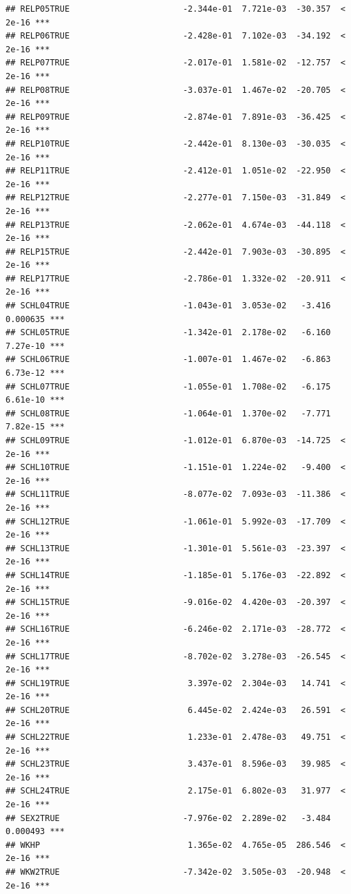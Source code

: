 \documentclass[
]{article}
\begin{document}
\begin{verbatim}
## RELP05TRUE                       -2.344e-01  7.721e-03  -30.357  < 2e-16 ***
## RELP06TRUE                       -2.428e-01  7.102e-03  -34.192  < 2e-16 ***
## RELP07TRUE                       -2.017e-01  1.581e-02  -12.757  < 2e-16 ***
## RELP08TRUE                       -3.037e-01  1.467e-02  -20.705  < 2e-16 ***
## RELP09TRUE                       -2.874e-01  7.891e-03  -36.425  < 2e-16 ***
## RELP10TRUE                       -2.442e-01  8.130e-03  -30.035  < 2e-16 ***
## RELP11TRUE                       -2.412e-01  1.051e-02  -22.950  < 2e-16 ***
## RELP12TRUE                       -2.277e-01  7.150e-03  -31.849  < 2e-16 ***
## RELP13TRUE                       -2.062e-01  4.674e-03  -44.118  < 2e-16 ***
## RELP15TRUE                       -2.442e-01  7.903e-03  -30.895  < 2e-16 ***
## RELP17TRUE                       -2.786e-01  1.332e-02  -20.911  < 2e-16 ***
## SCHL04TRUE                       -1.043e-01  3.053e-02   -3.416 0.000635 ***
## SCHL05TRUE                       -1.342e-01  2.178e-02   -6.160 7.27e-10 ***
## SCHL06TRUE                       -1.007e-01  1.467e-02   -6.863 6.73e-12 ***
## SCHL07TRUE                       -1.055e-01  1.708e-02   -6.175 6.61e-10 ***
## SCHL08TRUE                       -1.064e-01  1.370e-02   -7.771 7.82e-15 ***
## SCHL09TRUE                       -1.012e-01  6.870e-03  -14.725  < 2e-16 ***
## SCHL10TRUE                       -1.151e-01  1.224e-02   -9.400  < 2e-16 ***
## SCHL11TRUE                       -8.077e-02  7.093e-03  -11.386  < 2e-16 ***
## SCHL12TRUE                       -1.061e-01  5.992e-03  -17.709  < 2e-16 ***
## SCHL13TRUE                       -1.301e-01  5.561e-03  -23.397  < 2e-16 ***
## SCHL14TRUE                       -1.185e-01  5.176e-03  -22.892  < 2e-16 ***
## SCHL15TRUE                       -9.016e-02  4.420e-03  -20.397  < 2e-16 ***
## SCHL16TRUE                       -6.246e-02  2.171e-03  -28.772  < 2e-16 ***
## SCHL17TRUE                       -8.702e-02  3.278e-03  -26.545  < 2e-16 ***
## SCHL19TRUE                        3.397e-02  2.304e-03   14.741  < 2e-16 ***
## SCHL20TRUE                        6.445e-02  2.424e-03   26.591  < 2e-16 ***
## SCHL22TRUE                        1.233e-01  2.478e-03   49.751  < 2e-16 ***
## SCHL23TRUE                        3.437e-01  8.596e-03   39.985  < 2e-16 ***
## SCHL24TRUE                        2.175e-01  6.802e-03   31.977  < 2e-16 ***
## SEX2TRUE                         -7.976e-02  2.289e-02   -3.484 0.000493 ***
## WKHP                              1.365e-02  4.765e-05  286.546  < 2e-16 ***
## WKW2TRUE                         -7.342e-02  3.505e-03  -20.948  < 2e-16 ***

\end{verbatim}
\end{document}
